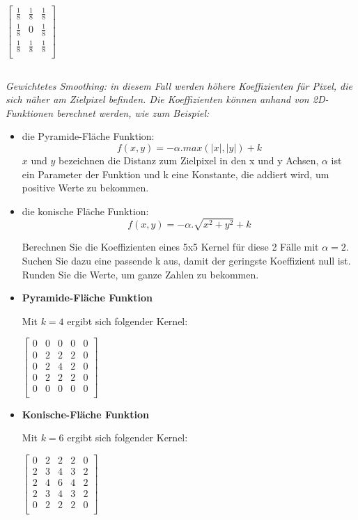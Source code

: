 \documentclass{article}
\begin{document}
$
\begin{bmatrix}
\frac{1}{8} & \frac{1}{8} & \frac{1}{8} \\
\frac{1}{8} & 0 & \frac{1}{8} \\
\frac{1}{8} & \frac{1}{8} & \frac{1}{8} \\
\end{bmatrix}
$
	
	\subsection{}
	
	\itshape Gewichtetes Smoothing: in diesem Fall werden höhere Koeffizienten für Pixel, die sich
näher am Zielpixel befinden. Die Koeffizienten können anhand von 2D-Funktionen berechnet werden, wie zum Beispiel:

		\begin{itemize}
			\item die Pyramide-Fläche Funktion:
			$$f (x, y) = -\alpha . max(|x|, |y|) + k $$
			$x$ und $y$ bezeichnen die Distanz zum Zielpixel in den x und y Achsen, $\alpha$ ist ein
			Parameter der Funktion und k eine Konstante, die addiert wird, um positive Werte
			zu bekommen.

			\item die konische Fläche Funktion:
				$$ f (x, y) = -\alpha . \sqrt{x^2 + y^2} + k $$
			
				Berechnen Sie die Koeffizienten eines 5x5 Kernel für diese 2 Fälle mit $\alpha = 2$. Suchen Sie
	dazu eine passende k aus, damit der geringste Koeffizient null ist. Runden Sie die Werte,
	um ganze Zahlen zu bekommen.
		\end{itemize}
	\normalfont
	
	\begin{itemize}
		\item \textbf{Pyramide-Fläche Funktion}

Mit $k = 4$ ergibt sich folgender Kernel:

$
\begin{bmatrix}
0 & 0 & 0 & 0 & 0 \\
0 & 2 & 2 & 2 & 0 \\
0 & 2 & 4 & 2 & 0 \\
0 & 2 & 2 & 2 & 0 \\
0 & 0 & 0 & 0 & 0 \\
\end{bmatrix}
$

		\item \textbf{Konische-Fläche Funktion}

Mit $k = 6$ ergibt sich folgender Kernel:

$
\begin{bmatrix}
0 & 2 & 2 & 2 & 0\\
2 & 3 & 4 & 3 & 2\\
2 & 4 & 6 & 4 & 2\\
2 & 3 & 4 & 3 & 2\\
0 & 2 & 2 & 2 & 0\\
\end{bmatrix}
$

	\end{itemize}
	
\end{document}
